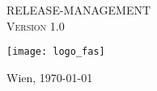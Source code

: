 %
%

\begin{titlepage}
\begin{center}
\vspace*{30mm} \Huge RELEASE-MANAGEMENT\\
\vspace*{10mm}
\large \textsc{Version 1.0}

\vfill \texttt{[image: logo\_fas]}\\
\vspace*{40mm}

	


Wien, \today
\end{center}
\end{titlepage}
